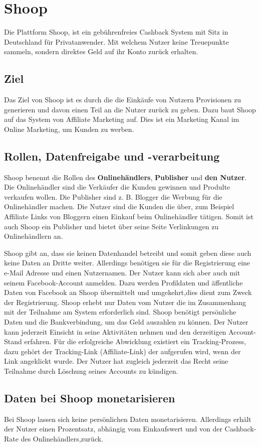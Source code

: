 \section{Shoop}
Die Plattform Shoop, ist ein gebührenfreies Cashback System mit Sitz in Deutschland für Privatanwender. Mit welchem Nutzer keine Treuepunkte sammeln, sondern direktes Geld auf ihr Konto zurück erhalten. 

\subsection{Ziel}
Das Ziel von Shoop ist es durch die die Einkäufe von Nutzern Provisionen zu generieren und davon einen Teil an die Nutzer zurück zu geben. \cite{shoop}
Dazu baut Shoop auf das System von Affiliate Marketing auf. Dies ist ein Marketing Kanal im Online Marketing, um Kunden zu werben. \cite{affiliate_marketing}

\subsection{Rollen, Datenfreigabe und -verarbeitung}
Shoop benennt die Rollen des \textbf{Onlinehändlers}, \textbf{Publisher} und \textbf{den Nutzer}.
Die Onlinehändler sind die Verkäufer die Kunden gewinnen und Produlte verkaufen wollen. Die Publisher sind z. B. Blogger die Werbung für die Onlinehändler machen. Die Nutzer sind die Kunden die über, zum Beispiel Affiliate Links von Bloggern einen Einkauf beim Onlinehändler tätigen. Somit ist auch Shoop ein Publisher und bietet über seine Seite Verlinkungen zu Onlinehändlern an. \cite{affiliate_marketing}

Shoop gibt an, dass sie keinen Datenhandel betreibt und somit geben diese auch keine Daten an Dritte weiter. \cite{shoop}
Allerdings benötigen sie für die Registrierung eine e-Mail Adresse und einen Nutzernamen. Der Nutzer kann sich aber auch mit seinem Facebook-Account anmelden. Dazu werden Profildaten  und äffentliche Daten von Facebook an Shoop übermittelt und umgekehrt,dies dient zum Zweck der Registrierung.
Shoop erhebt nur Daten vom Nutzer die im Zusammenhang mit der Teilnahme am System erforderlich sind. Shoop benötigt persönliche Daten und die Bankverbindung, um das Geld auszahlen zu können. Der Nutzer kann jederzeit Einsicht in seine Aktivitäten nehmen und den derzeitigen Account-Stand erfahren. Für die erfolgreiche Abwicklung existiert ein Tracking-Prozess, dazu gehört der Tracking-Link (Affiliate-Link) der aufgerufen wird, wenn der Link angeklickt wurde.
Der Nutzer hat zugleich jederzeit das Recht seine Teilnahme durch Löschung seines Accounts zu kündigen.\cite{shoop_agb}

\subsection{Daten bei Shoop monetarisieren}
Bei Shoop lassen sich keine persönlichen Daten monetarisieren. Allerdings erhält der Nutzer einen Prozentsatz, abhängig vom Einkaufswert und von der Cashback-Rate des Onlinehändlers,zurück. 